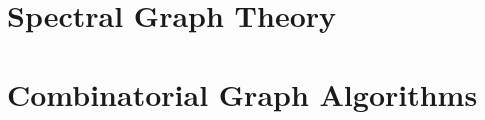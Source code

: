 \documentclass[12pt,a4paper,openany]{book}
\begin{document}
\part{Spectral Graph Theory}
\label{part:sg}










\part{Combinatorial Graph Algorithms}
\label{part:combinatorial}








% 
% 
\end{document}
